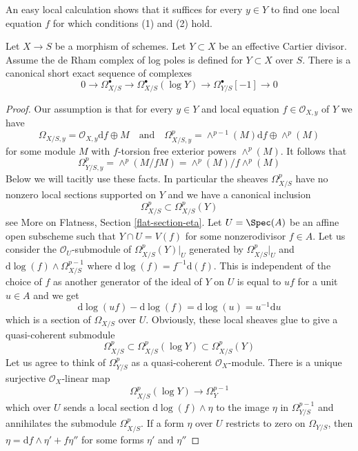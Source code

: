 \noindent
An easy local calculation shows that it suffices for every $y \in Y$
to find one local equation $f$ for which conditions (1) and (2) hold.

\begin{lemma}
\label{lemma-log-complex}
Let $X \to S$ be a morphism of schemes. Let $Y \subset X$ be an
effective Cartier divisor.
Assume the de Rham complex of log poles is defined for $Y \subset X$ over $S$.
There is a canonical short exact sequence
of complexes
$$
0 \to \Omega^\bullet_{X/S} \to
\Omega^\bullet_{X/S}(\log Y) \to
\Omega^\bullet_{Y/S}[-1] \to 0
$$
\end{lemma}

\begin{proof}
Our assumption is that for every $y \in Y$ and local equation
$f \in \mathcal{O}_{X, y}$ of $Y$ we have
$$
\Omega_{X/S, y} = \mathcal{O}_{X, y}\text{d}f \oplus M
\quad\text{and}\quad
\Omega^p_{X/S, y} = \wedge^{p - 1}(M)\text{d}f \oplus \wedge^p(M)
$$
for some module $M$ with $f$-torsion free exterior powers $\wedge^p(M)$.
It follows that
$$
\Omega^p_{Y/S, y} = \wedge^p(M/fM) = \wedge^p(M)/f\wedge^p(M)
$$
Below we will tacitly use these facts.
In particular the sheaves $\Omega^p_{X/S}$ have no nonzero local
sections supported on $Y$ and we have a canonical inclusion
$$
\Omega^p_{X/S} \subset \Omega^p_{X/S}(Y)
$$
see More on Flatness, Section \ref{flat-section-eta}. Let $U = \Spec(A)$
be an affine open subscheme such that $Y \cap U = V(f)$ for some
nonzerodivisor $f \in A$. Let us consider the $\mathcal{O}_U$-submodule
of $\Omega^p_{X/S}(Y)|_U$ generated by
$\Omega^p_{X/S}|_U$ and $\text{d}\log(f) \wedge \Omega^{p - 1}_{X/S}$
where $\text{d}\log(f) = f^{-1}\text{d}(f)$.
This is independent of the choice of $f$ as another generator of the
ideal of $Y$ on $U$ is equal to $uf$ for a unit $u \in A$ and we get
$$
\text{d}\log(uf) - \text{d}\log(f) = \text{d}\log(u) = u^{-1}\text{d}u
$$
which is a section of $\Omega_{X/S}$ over $U$. Obviously, these local
sheaves glue to give a quasi-coherent submodule
$$
\Omega^p_{X/S} \subset \Omega^p_{X/S}(\log Y) \subset \Omega^p_{X/S}(Y)
$$
Let us agree to think of $\Omega^p_{Y/S}$ as a quasi-coherent
$\mathcal{O}_X$-module. There is a unique surjective
$\mathcal{O}_X$-linear map
$$
\Omega^p_{X/S}(\log Y) \to \Omega^{p - 1}_Y
$$
which over $U$ sends a local section $\text{d}\log(f) \wedge \eta$ to
the image $\eta$ in $\Omega^{p - 1}_{Y/S}$ and
annihilates the submodule $\Omega^p_{X/S}$.
If a form $\eta$ over $U$ restricts to zero on $\Omega_{Y/S}$, then
$\eta = \text{d}f \wedge \eta' + f\eta''$ for some forms $\eta'$ and $\eta''$

\end{proof}
